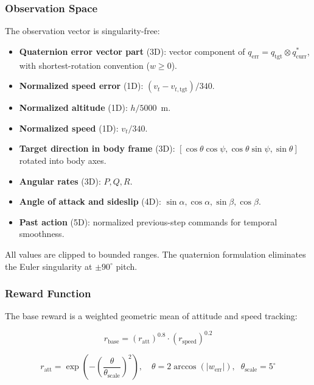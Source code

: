 \documentclass{article}
\begin{document}
\subsubsection{Observation Space}

The observation vector is singularity-free:

\begin{itemize}
  \item \textbf{Quaternion error vector part} (3D): vector component of $q_{\text{err}} = q_{\text{tgt}} \otimes q_{\text{curr}}^*$, with shortest-rotation convention ($w \geq 0$).
  \item \textbf{Normalized speed error} (1D): $(v_t - v_{t,\text{tgt}}) / 340$.
  \item \textbf{Normalized altitude} (1D): $h / 5000$~m.
  \item \textbf{Normalized speed} (1D): $v_t / 340$.
  \item \textbf{Target direction in body frame} (3D): $[\cos\theta\cos\psi, \cos\theta\sin\psi, \sin\theta]$ rotated into body axes.
  \item \textbf{Angular rates} (3D): $P, Q, R$.
  \item \textbf{Angle of attack and sideslip} (4D): $\sin\alpha, \cos\alpha, \sin\beta, \cos\beta$.
  \item \textbf{Past action} (5D): normalized previous-step commands for temporal smoothness.
\end{itemize}

All values are clipped to bounded ranges.
The quaternion formulation eliminates the Euler singularity at $\pm90^\circ$ pitch.

\subsubsection{Reward Function}

The base reward is a weighted geometric mean of attitude and speed tracking:

\begin{equation}
  r_{\text{base}} = (r_{\text{att}})^{0.8} \cdot (r_{\text{speed}})^{0.2}
\end{equation}

\begin{equation}
  r_{\text{att}} = \exp\left(-\left(\frac{\theta}{\theta_{\text{scale}}}\right)^2\right), \quad \theta = 2\arccos(|w_{\text{err}}|), \;\; \theta_{\text{scale}} = 5^\circ
\end{equation}
\end{document}
